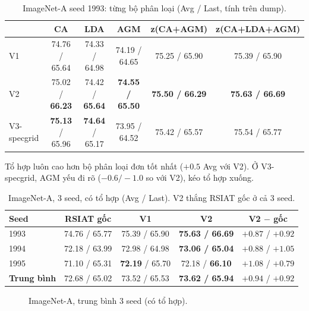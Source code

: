 \documentclass[11pt]{article}
\begin{document}
\begin{table}[H]
\centering\small
\caption{ImageNet-A seed 1993: từng bộ phân loại (Avg / Last, tính trên dump).}
\label{tab:heads}
\begin{tabular}{lccccc}
\toprule
 & CA & LDA & AGM & z(CA+AGM) & z(CA+LDA+AGM) \\
\midrule
V1 & 74.76 / 65.64 & 74.33 / 64.98 & 74.19 / 64.65 & 75.25 / 65.90 & 75.39 / 65.90 \\
V2 & 75.02 / \textbf{66.23} & 74.42 / \textbf{65.64} & \textbf{74.55 / 65.50} & \textbf{75.50 / 66.29} & \textbf{75.63 / 66.69} \\
V3-specgrid & \textbf{75.13} / 65.96 & \textbf{74.64} / 65.17 & 73.95 / 64.52 & 75.42 / 65.57 & 75.54 / 65.77 \\
\bottomrule
\end{tabular}
\end{table}
Tổ hợp luôn cao hơn bộ phân loại đơn tốt nhất ($+0.5$ Avg với V2). Ở V3-specgrid, AGM yếu đi rõ ($-0.6/-1.0$ so với V2),
kéo tổ hợp xuống.

\begin{table}[H]
\centering\small
\caption{ImageNet-A, 3 seed, có tổ hợp (Avg / Last). V2 thắng RSIAT gốc ở cả 3 seed.}
\label{tab:ina3}
\begin{tabular}{lcccc}
\toprule
Seed & RSIAT gốc & V1 & V2 & V2 $-$ gốc \\
\midrule
1993 & 74.76 / 65.77 & 75.39 / 65.90 & \textbf{75.63 / 66.69} & $+0.87$ / $+0.92$ \\
1994 & 72.18 / 63.99 & 72.98 / 64.98 & \textbf{73.06 / 65.04} & $+0.88$ / $+1.05$ \\
1995 & 71.10 / 65.31 & \textbf{72.19} / 65.70 & 72.18 / \textbf{66.10} & $+1.08$ / $+0.79$ \\
\midrule
\textbf{Trung bình} & 72.68 / 65.02 & 73.52 / 65.53 & \textbf{73.62 / 65.94} & $\mathbf{+0.94}$ / $\mathbf{+0.92}$ \\
\bottomrule
\end{tabular}
\end{table}

\begin{figure}[H]
\centering
{}
\caption{ImageNet-A, trung bình 3 seed (có tổ hợp).}
\end{figure}
\end{document}
